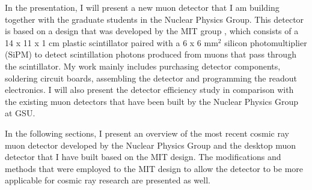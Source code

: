 In the presentation, I will present a new muon detector that I am building together with the graduate students in the Nuclear Physics Group. This detector is based on a design that was developed by the MIT group \cite{MIT_detector}, which consists of a 14 x 11 x 1 cm plastic scintillator paired with a 6 x 6 mm\(^2\) silicon photomultiplier (SiPM) to detect scintillation photons produced from muons that pass through the scintillator. My work mainly includes purchasing detector components, soldering circuit boards, assembling the detector and programming the readout electronics. I will also present the detector efficiency study in comparison with the existing muon detectors that have been built by the Nuclear Physics Group at GSU.


In the following sections, I present an overview of the most recent cosmic ray muon detector developed by the Nuclear Physics Group and the desktop muon detector that I have built based on the MIT design. The modifications and methods that were employed to the MIT design to allow the detector to be more applicable for cosmic ray research are presented as well. 